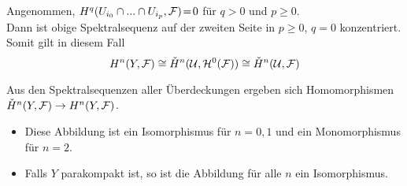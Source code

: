 \documentclass{cheat-sheet}
\begin{document}
\begin{lem}
  Angenommen, $H^q(U_{i_0} \cap ... \cap U_{i_p}, \mathcal{F}) \!=\! 0$ für $q \!>\! 0$ und $p \!\geq\! 0$. \\
  Dann ist obige Spektralsequenz auf der zweiten Seite in $p \geq 0$, $q = 0$ konzentriert.
  Somit gilt in diesem Fall
  \[ H^n(Y, \mathcal{F}) \cong \check{H}^n(\mathcal{U}, \mathcal{H}^0(\mathcal{F})) \cong \check{H}^n(\mathcal{U}, \mathcal{F}) \]
\end{lem}

\begin{lem}
  Aus den Spektralsequenzen aller Überdeckungen ergeben sich Homomorphismen $\check{H}^n(Y, \mathcal{F}) \to H^n(Y, \mathcal{F})$.
  \begin{itemize}
    \item Diese Abbildung ist ein Isomorphismus für $n = 0, 1$ und ein Monomorphismus für $n = 2$.
    \item Falls $Y$ parakompakt ist, so ist die Abbildung für alle $n$ ein Isomorphismus.
  \end{itemize}
\end{lem}

\end{document}
